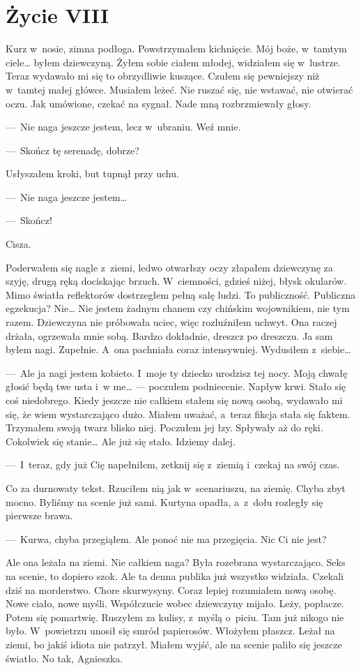 \chapter{Życie VIII}

Kurz w~nosie, zimna podłoga. Powstrzymałem kichnięcie. Mój boże, w~tamtym ciele… byłem dziewczyną. Żyłem sobie ciałem młodej, widziałem się w~lustrze. Teraz wydawało mi się to obrzydliwie kuszące. Czułem się pewniejszy niż w~tamtej małej główce. Musiałem leżeć. Nie ruszać się, nie wstawać, nie otwierać oczu. Jak umówione, czekać na sygnał. Nade mną rozbrzmiewały głosy.

---~Nie naga jeszcze jestem, lecz w~ubraniu. Weź mnie.

---~Skończ tę serenadę, dobrze?

Usłyszałem kroki, but tupnął przy uchu.

---~Nie naga jeszcze jestem…

---~Skończ! 

Cisza. 

Poderwałem się nagle z~ziemi, ledwo otwarłszy oczy złapałem dziewczynę za szyję, drugą ręką dociskając brzuch. W~ciemności, gdzieś niżej, błysk okularów. Mimo światła reflektorów dostrzegłem pełną salę ludzi. To publiczność. Publiczna egzekucja? Nie… Nie jestem żadnym chanem czy chińskim wojownikiem, nie tym razem. Dziewczyna nie próbowała uciec,  więc rozluźniłem uchwyt. Ona raczej drżała, ogrzewała mnie sobą. Bardzo dokładnie, dreszcz po dreszczu. Ja sam byłem nagi. Zupełnie. A~ona pachniała coraz intensywniej. Wydusiłem z~siebie…

---~Ale ja nagi jestem kobieto. I~moje ty dziecko urodzisz tej nocy. Moją chwałę głosić będą twe usta i~w me… ---
poczułem podniecenie. Napływ krwi. Stało się coś niedobrego. Kiedy jeszcze nie całkiem stałem się nową osobą, wydawało mi się, że wiem wystarczająco dużo. Miałem uważać, a~teraz fikcja stała się faktem. Trzymałem swoją twarz blisko niej. Poczułem jej łzy. Spływały aż do ręki. Cokolwiek się stanie… Ale już się stało. Idziemy dalej.

---~I~teraz, gdy już Cię napełniłem, zetknij się z~ziemią i~czekaj na swój czas.

Co za durnowaty tekst. Rzuciłem nią jak w~scenariuszu, na ziemię. Chyba zbyt mocno. Byliśmy na scenie już sami. Kurtyna opadła, a~z~dołu rozległy się pierwsze brawa.

---~Kurwa, chyba przegiąłem. Ale ponoć nie ma przegięcia. Nic Ci nie jest?

Ale ona leżała na ziemi. Nie całkiem naga? Była rozebrana wystarczająco. Seks na scenie, to dopiero szok. Ale ta denna publika już wszystko widziała. Czekali dziś na morderstwo. Chore skurwysyny. Coraz lepiej rozumiałem nową osobę. Nowe ciało, nowe myśli. Współczucie wobec dziewczyny mijało. Leży, popłacze. Potem się pomartwię. Ruszyłem za kulisy, z~myślą o~piciu. Tam  już nikogo nie było. W~powietrzu unosił się smród papierosów. Włożyłem płaszcz. Leżał na ziemi, bo jakiś idiota nie patrzył. Miałem wyjść, ale na scenie paliło się jeszcze światło. No tak, Agnieszka.

